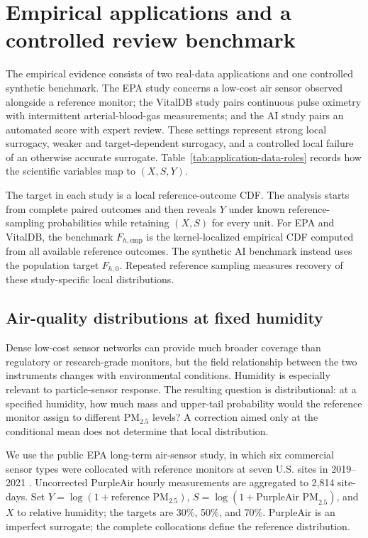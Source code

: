 \section{Empirical applications and a controlled review benchmark}
\label{sec:applications}

The empirical evidence consists of two real-data applications and one
controlled synthetic benchmark. The EPA study concerns a low-cost air sensor
observed alongside a reference monitor; the VitalDB study pairs continuous
pulse oximetry with intermittent arterial-blood-gas measurements; and the AI
study pairs an automated score with expert review. These settings represent
strong local surrogacy, weaker and target-dependent surrogacy, and a controlled
local failure of an otherwise accurate surrogate. Table~\ref{tab:application-data-roles}
records how the scientific variables map to \((X,S,Y)\).

The target in each study is a local reference-outcome CDF. The analysis starts
from complete paired outcomes and then reveals \(Y\) under
known reference-sampling probabilities while retaining \((X,S)\) for every
unit. For EPA and VitalDB, the benchmark \(F_{h,\mathrm{emp}}\) is the
kernel-localized empirical CDF computed from all available reference outcomes.
The synthetic AI benchmark instead uses the population target \(F_{h,0}\).
Repeated reference sampling measures recovery of these study-specific local
distributions.





\subsection{Air-quality distributions at fixed humidity}

Dense low-cost sensor networks can provide much broader coverage than
regulatory or research-grade monitors, but the field relationship between the
two instruments changes with environmental conditions. Humidity is especially
relevant to particle-sensor response. The resulting question is distributional:
at a specified humidity, how much mass and upper-tail probability would the
reference monitor assign to different PM\(_{2.5}\) levels? A correction aimed
only at the conditional mean does not determine that local distribution.

We use the public EPA long-term air-sensor study, in which six commercial sensor
types were collocated with reference monitors at seven U.S. sites in 2019--2021
\citep{barkjohn2025sensors,epa2025longtermdata}. Uncorrected PurpleAir hourly
measurements are aggregated to 2,814 site-days. Set
\(Y=\log(1+\text{reference PM}_{2.5})\),
\(S=\log(1+\text{PurpleAir PM}_{2.5})\), and \(X\) to relative humidity; the
targets are 30\%, 50\%, and 70\%. PurpleAir is an imperfect surrogate; the
complete collocations define the reference distribution.

